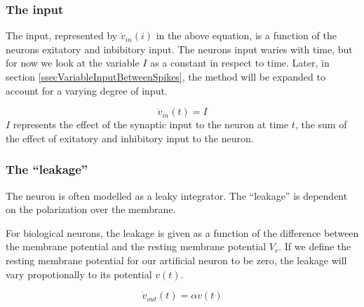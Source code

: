 \subsubsection{The input}
The input, represented by $\dot{v}_{in}(i)$ in the above equation, is a function of the neurons exitatory and inbibitory input. 
The neurons input waries with time, but for now we look at the variable $I$ as a constant in respect to time.
Later, in section \ref{ssecVariableInputBetweenSpikes}, the method will be expanded to account for a varying degree of input. %

\begin{equation}
	\dot{v}_{in}(t) = I
\end{equation}
$I$ represents the effect of the synaptic input to the neuron at time $t$, the sum of the effect of exitatory and inhibitory input to the neuron.



\subsubsection{The ``leakage''}
The neuron is often modelled as a leaky integrator. The ``leakage'' is dependent on the polarization over the membrane. 

For biological neurons, the leakage is given as a function of the difference between the membrane potential and the resting membrane potential $V_r$. 
If we define the resting membrane potential for our artificial neuron to be zero, the leakage will vary propotionally to its potential $v(t)$.

\begin{equation}
	\dot{v}_{out}(t) = \alpha v(t)
\end{equation}

